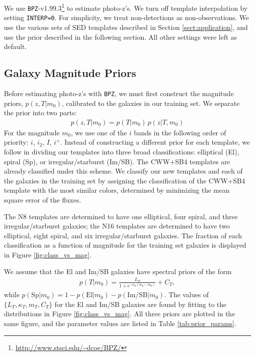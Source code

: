 \documentclass[twocolumn]{aastex63}
\newcommand{\pzcode}[1]{\texttt{#1}}
\newcommand{\bpz}{\pzcode{BPZ}}
\begin{document}
    We use \bpz-v1.99.3\footnote{\url{http://www.stsci.edu/~dcoe/BPZ/}} to estimate photo-z's.
    We turn off template interpolation by setting \texttt{INTERP=0}.
    For simplicity, we treat non-detections as non-observations.
    We use the various sets of SED templates described in Section \ref{sect:application}, and use the prior described in the following section.
    All other settings were left as default.

    \subsection{Galaxy Magnitude Priors}

    Before estimating photo-z's with \bpz, we must first construct the magnitude priors, $p(z,T|m_0)$, calibrated to the galaxies in our training set.
    We separate the prior into two parts:
    \begin{align}
        p(z,T|m_0) = p(T|m_0) \, p(z|T,m_0)
    \end{align}
    For the magnitude $m_0$, we use one of the $i$ bands in the following order of priority: $i$, $i_2$, $I$, $i^+$.
    Instead of constructing a different prior for each template, we follow \citet{Benitez2000a} in dividing our templates into three broad classifications: elliptical (El), spiral (Sp), or irregular/starburst (Im/SB).
    The CWW+SB4 templates are already classified under this scheme.
    We classify our new templates and each of the galaxies in the training set by assigning the classification of the CWW+SB4 template with the most similar colors, determined by minimizing the mean square error of the fluxes.
    
    The N8 templates are determined to have one elliptical, four spiral, and three irregular/starburst galaxies; the N16 templates are determined to have two elliptical, eight spiral, and six irregular/starburst galaxies.
    The fraction of each classification as a function of magnitude for the training set galaxies is displayed in Figure \ref{fig:class_vs_mag}.

    We assume that the El and Im/SB galaxies have spectral priors of the form
    \begin{align}
        p(T|m_0) = \frac{L_T}{1+e^{-\kappa_T(m_0 - m_T)}} + C_T,
    \end{align}
    while $p(\text{Sp}|m_0) = 1 - p(\text{El}|m_0) - p(\text{Im/SB}|m_0)$.
    The values of $\{L_T,\kappa_T,m_T,C_T\}$ for the El and Im/SB galaxies are found by fitting to the distributions in Figure \ref{fig:class_vs_mag}.
    All three priors are plotted in the same figure, and the parameter values are listed in Table \ref{tab:prior_params}.
\end{document}
